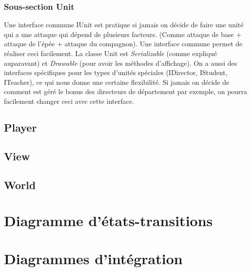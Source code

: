 		\subsubsection{Sous-section Unit}
			Une interface commune IUnit est pratique si jamais on décide de faire une unité qui a une attaque qui dépend de plusieurs facteurs.
			(Comme attaque de base + attaque de l'épée + attaque du compagnon). Une interface commune permet de réaliser ceci facilement.
			La classe Unit est \textit{Serializable} (comme expliqué auparavant) et \textit{Drawable} (pour avoir les méthodes d'affichage).
			On a aussi des interfaces spécifiques pour les types d'unités spéciales (IDirector, IStudent, ITeacher), ce qui nous donne une certaine flexibilité.
			Si jamais on décide de comment est géré le bonus des directeurs de département par exemple, on pourra facilement changer ceci avec cette interface.
		
	\subsection{Player}
	\subsection{View}
	\subsection{World}
	
	
\section{Diagramme d'états-transitions}

\section{Diagrammes d'intégration}







































